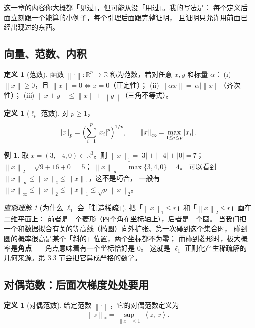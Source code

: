 \documentclass[11pt,a4paper,UTF8]{ctexart}
\theoremstyle{plain}
\theoremstyle{definition}
\newtheorem{definition}[theorem]{定义}
\newtheorem{example}[theorem]{例}
\theoremstyle{remark}
\newtheorem{intuition}[theorem]{直观理解}
\newcommand{\R}{\mathbb{R}}
\newcommand{\norm}[1]{\left\lVert #1 \right\rVert}
\newcommand{\abs}[1]{\left\lvert #1 \right\rvert}
\newcommand{\inner}[2]{\left\langle #1,\, #2 \right\rangle}
\begin{document}
这一章的内容你大概都「见过」，但可能从没「用过」。我的写法是：
每个定义后面立刻跟一个能算的小例子，每个引理后面跟完整证明，
且证明只允许用前面已经出现过的东西。

\subsection{向量、范数、内积}

\begin{definition}[范数]
函数 $\norm{\cdot}:\R^p\to\R$ 称为范数，若对任意 $x,y$ 和标量 $\alpha$：
(i) $\norm{x}\ge 0$，且 $\norm{x}=0\iff x=0$（正定性）；
(ii) $\norm{\alpha x}=\abs{\alpha}\norm{x}$（齐次性）；
(iii) $\norm{x+y}\le\norm{x}+\norm{y}$（三角不等式）。
\end{definition}

\begin{definition}[$\ell_p$ 范数]\label{def:lp}
对 $p\ge 1$，
\[
\norm{x}_p=\Bigl(\sum_{i=1}^p\abs{x_i}^p\Bigr)^{1/p},
\qquad
\norm{x}_\infty=\max_{1\le i\le p}\abs{x_i}.
\]
\end{definition}

\begin{example}
取 $x=(3,-4,0)\in\R^3$。则
$\norm{x}_1=\abs{3}+\abs{-4}+\abs{0}=7$；
$\norm{x}_2=\sqrt{9+16+0}=5$；
$\norm{x}_\infty=\max\{3,4,0\}=4$。
可以看到 $\norm{x}_\infty\le\norm{x}_2\le\norm{x}_1$，这不是巧合，
一般有 $\norm{x}_\infty\le\norm{x}_2\le\norm{x}_1\le\sqrt{p}\,\norm{x}_2$。
\end{example}

\begin{intuition}[为什么 $\ell_1$ 会「制造稀疏」]
把「$\norm{x}_1\le r$」和「$\norm{x}_2\le r$」画在二维平面上：
前者是一个菱形（四个角在坐标轴上），后者是一个圆。
当我们把一个和数据拟合有关的等高线（椭圆）向外扩张、第一次碰到这个集合时，
碰到圆的概率很高是某个「斜的」位置，两个坐标都不为零；
而碰到菱形时，极大概率是\textbf{角点}——角点意味着有一个坐标恰好是 $0$。
这就是 $\ell_1$ 正则化产生稀疏解的几何来源。第 3.3 节会把它算成严格的数学。
\end{intuition}

\subsection{对偶范数：后面次梯度处处要用}

\begin{definition}[对偶范数]\label{def:dualnorm}
给定范数 $\norm{\cdot}$，它的对偶范数定义为
\[
\norm{z}_{\ast}=\sup_{\norm{x}\le 1}\ \inner{z}{x}.
\]
\end{definition}
\end{document}

